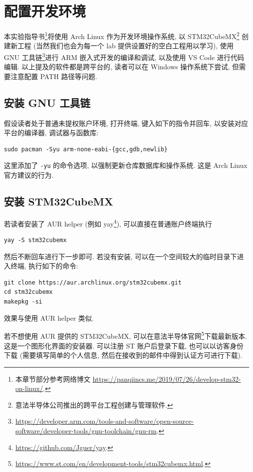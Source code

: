 \chapter{配置开发环境}
本实验指导书\footnote{本章节部分参考网络博文 \url{https://panqiincs.me/2019/07/26/develop-stm32-on-linux/}.}将使用 Arch Linux 作为开发环境操作系统, 以 STM32CubeMX\footnote{意法半导体公司推出的跨平台工程创建与管理软件.} 创建新工程 (当然我们也会为每一个 lab 提供设置好的空白工程用以学习), 使用 GNU 工具链\footnote{\url{https://developer.arm.com/tools-and-software/open-source-software/developer-tools/gnu-toolchain/gnu-rm}.}进行 ARM 嵌入式开发的编译和调试, 以及使用 VS Code 进行代码编辑. 以上提及的软件都是跨平台的, 读者可以在 Windows 操作系统下尝试, 但需要注意配置 PATH 路径等问题.

\section{安装 GNU 工具链}
假设读者处于普通未提权账户环境, 打开终端, 键入如下的指令并回车, 以安装对应平台的编译器, 调试器与函数库:

\begin{verbatim}
sudo pacman -Syu arm-none-eabi-{gcc,gdb,newlib}
\end{verbatim}

这里添加了 \texttt{-yu} 的命令选项, 以强制更新仓库数据库和操作系统. 这是 Arch Linux 官方建议的行为.

\section{安装 STM32CubeMX}
若读者安装了 AUR helper (例如 yay\footnote{\url{https://github.com/Jguer/yay}.}), 可以直接在普通账户终端执行

\begin{verbatim}
yay -S stm32cubemx
\end{verbatim}

然后不断回车进行下一步即可. 若没有安装, 可以在一个空间较大的临时目录下进入终端, 执行如下的命令:

\begin{verbatim}
git clone https://aur.archlinux.org/stm32cubemx.git
cd stm32cubemx
makepkg -si
\end{verbatim}

效果与使用 AUR helper 类似.

若不想使用 AUR 提供的 STM32CubeMX, 可以在意法半导体官网\footnote{\url{https://www.st.com/en/development-tools/stm32cubemx.html}.}下载最新版本. 这是一个图形化界面的安装器. 可以注册 ST 账户后登录下载, 也可以以访客身份下载 (需要填写简单的个人信息, 然后在接收到的邮件中得到认证方可进行下载).

